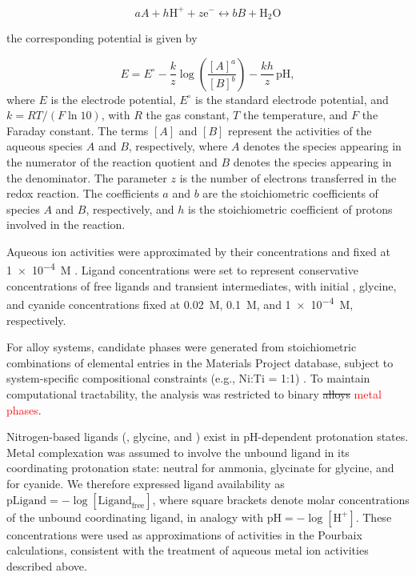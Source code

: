 \documentclass[twoside,twocolumn,9pt]{article}
\begin{document}
\begin{equation} \label{eq:reaction}
aA + h\text{H}^+ + z\text{e}^- \leftrightarrow bB + \text{H}_2\text{O}
\end{equation}

the corresponding potential is given by

\begin{equation} \label{eq:nernst}
E = E^\circ - \frac{k}{z} \log \left(\frac{[A]^a}{[B]^b}\right) - \frac{k h}{z} \, \mathrm{pH},
\end{equation}
where \(E\) is the electrode potential, \(E^\circ\) is the standard electrode potential, and \(k = RT/(F \ln 10)\), with \(R\) the gas constant, \(T\) the temperature, and \(F\) the Faraday constant. The terms \([A]\) and \([B]\) represent the activities of the aqueous species \(A\) and \(B\), respectively, where \(A\) denotes the species appearing in the numerator of the reaction quotient and \(B\) denotes the species appearing in the denominator. The parameter \(z\) is the number of electrons transferred in the redox reaction. The coefficients \(a\) and \(b\) are the stoichiometric coefficients of species \(A\) and \(B\), respectively, and \(h\) is the stoichiometric coefficient of protons involved in the reaction.

Aqueous ion activities were approximated by their concentrations and fixed at \SI{1e-4}{M} \cite{Huang2017ImprovedCompounds, Wang2020PredictingFunctional}. Ligand concentrations were set to represent conservative concentrations of free ligands and transient intermediates, with initial , glycine, and cyanide concentrations fixed at \SI{0.02}{M}, \SI{0.1}{M}, and \SI{1e-4}{M}, respectively. 

For alloy systems, candidate phases were generated from stoichiometric combinations of elemental entries in the Materials Project database, subject to system-specific compositional constraints (e.g., Ni:Ti = 1:1) \cite{Thompson2011PourbaixSystems}. To maintain computational tractability, the analysis was restricted to binary \sout{alloys} \textcolor{red}{metal phases}.

Nitrogen-based ligands (, glycine, and ) exist in pH-dependent protonation states. Metal complexation was assumed to involve the unbound ligand in its coordinating protonation state: neutral  for ammonia, glycinate for glycine, and  for cyanide. We therefore expressed ligand availability as
\(\mathrm{pLigand} = -\log[\mathrm{Ligand}_{\mathrm{free}}]\), where square brackets denote molar concentrations of the unbound coordinating ligand, in analogy with $\text{pH} = -\log[\text{H}^+]$. These concentrations were used as approximations of activities in the Pourbaix calculations, consistent with the treatment of aqueous metal ion activities described above.
\end{document}
